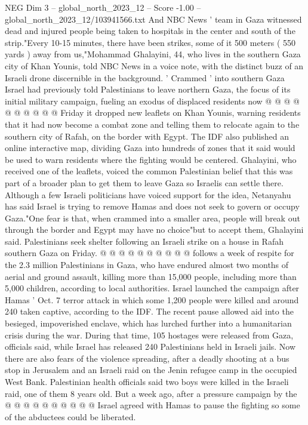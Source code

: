 \begin{textsample}{NEG Dim 3 – global\_north\_2023\_12 – Score -1.00 – global\_north\_2023\_12/103941566.txt}
And NBC News ' team in Gaza witnessed dead and injured people being taken to hospitals in the center and south of the strip."Every 10-15 minutes, there have been strikes, some of it 500 meters ( 550 yards ) away from us,"Mohammad Ghalayini, 44, who lives in the southern Gaza city of Khan Younis, told NBC News in a voice note, with the distinct buzz of an Israeli drone discernible in the background. ' Crammed ' into southern Gaza Israel had previously told Palestinians to leave northern Gaza, the focus of its initial military campaign, fueling an exodus of displaced residents now @ @ @ @ @ @ @ @ @ @ Friday it dropped new leaflets on Khan Younis, warning residents that it had now become a combat zone and telling them to relocate again to the southern city of Rafah, on the border with Egypt.
The IDF also published an online interactive map, dividing Gaza into hundreds of zones that it said would be used to warn residents where the fighting would be centered.
Ghalayini, who received one of the leaflets, voiced the common Palestinian belief that this was part of a broader plan to get them to leave Gaza so Israelis can settle there.
Although a few Israeli politicians have voiced support for the idea, Netanyahu has said Israel is trying to remove Hamas and does not seek to govern or occupy Gaza."One fear is that, when crammed into a smaller area, people will break out through the border and Egypt may have no choice"but to accept them, Ghalayini said.
Palestinians seek shelter following an Israeli strike on a house in Rafah southern Gaza on Friday. @ @ @ @ @ @ @ @ @ @ follows a week of respite for the 2.3 million Palestinians in Gaza, who have endured almost two months of aerial and ground assault, killing more than 15,000 people, including more than 5,000 children, according to local authorities.
Israel launched the campaign after Hamas ' Oct. 7 terror attack in which some 1,200 people were killed and around 240 taken captive, according to the IDF.
The recent pause allowed aid into the besieged, impoverished enclave, which has lurched further into a humanitarian crisis during the war.
During that time, 105 hostages were released from Gaza, officials said, while Israel has released 240 Palestinians held in Israeli jails.
Now there are also fears of the violence spreading, after a deadly shooting at a bus stop in Jerusalem and an Israeli raid on the Jenin refugee camp in the occupied West Bank.
Palestinian health officials said two boys were killed in the Israeli raid, one of them 8 years old.
But a week ago, after a pressure campaign by the @ @ @ @ @ @ @ @ @ @ Israel agreed with Hamas to pause the fighting so some of the abductees could be liberated.

\end{textsample}
